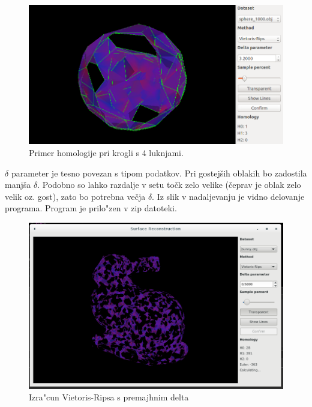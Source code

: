 \documentclass[11pt]{article}
\begin{document}
\begin{figure}[htb]
    \centering
    \includegraphics[width=1\textwidth]{lukne_primer.png}
    \caption{Primer homologije pri krogli s 4 luknjami.}
    \label{lukne}
\end{figure}

$\delta$ parameter je tesno povezan s tipom podatkov. Pri gostejših oblakih bo zadostila manjša $\delta$. Podobno so lahko razdalje v setu točk zelo velike (čeprav je oblak zelo velik oz. gost), zato bo potrebna večja $\delta$. Iz slik v nadaljevanju je vidno delovanje programa. Program je prilo"zen v zip datoteki.

\begin{figure}[htb]
    \centering
    \includegraphics[width=1\textwidth]{vr_long.png}
    \caption{Izra"cun Vietoris-Ripsa s premajhnim delta}
    \label{fig:vr1}
\end{figure}
\end{document}
